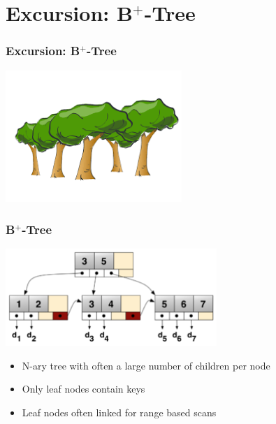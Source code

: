 \documentclass{beamer}
\begin{document}
\section{Excursion: B$^{+}$-Tree} 
\begin{frame}
\frametitle{Excursion: B$^{+}$-Tree}
\begin{center}
	\includegraphics[width=0.5\textwidth]{img/forest.png}
\end{center}
\end{frame}
\begin{frame}
\frametitle{B$^{+}$-Tree}
	\begin{center}
		\includegraphics[width=0.6\textwidth]{img/bplus_tree.png}
	\end{center}
	\begin{itemize}
		\item N-ary tree with often a large number of children per node
		\item Only leaf nodes contain keys
		\item Leaf nodes often linked for range based scans
	\end{itemize}
\end{frame}
\end{document}
